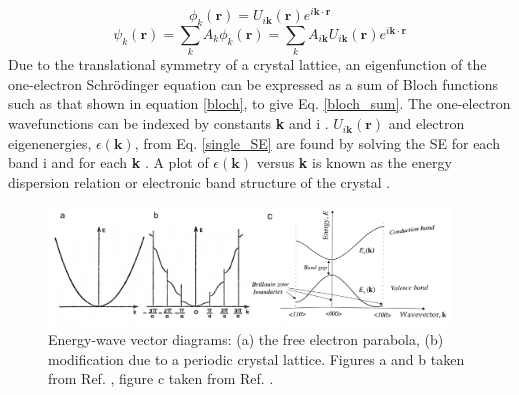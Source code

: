 \documentclass[11pt, twoside]{report}
\begin{document}
\begin{equation} \label{bloch}
\phi_k(\mathbf{r}) = U_{i\mathbf{k}}(\mathbf{r}) e^{i\mathbf{k \cdot r}} 
\end{equation}
\begin{equation} \label{bloch_sum}
\psi_k(\mathbf{r}) = \sum_k A_k \phi_k(\mathbf{r}) = \sum_k A_{i\mathbf{k}}U_{i\mathbf{k}}(\mathbf{r}) e^{i\mathbf{k \cdot r}} 
\end{equation}
Due to the translational symmetry of a crystal lattice, an eigenfunction of the one-electron Schr{\"o}dinger equation can be expressed as a sum of Bloch functions such as that shown in equation \ref{bloch}, to give Eq. \ref{bloch_sum}. The one-electron wavefunctions can be indexed by constants \textbf{k} and i \cite{fund_semi}. 
$U_{i\mathbf{k}}(\mathbf{r})$ and electron eigenenergies, $\epsilon(\mathbf{k})$, from Eq. \ref{single_SE} are found by solving the SE for each band i and for each \textbf{k} \cite{Nelson3}.
A plot of $\epsilon(\textbf{k})$ versus \textbf{k} is known as the energy dispersion relation or electronic band structure of the crystal \cite{fund_semi}.
\begin{figure}[h!]
  \centering
    \includegraphics[width=0.95\textwidth]{figures/bs1_2.png}
    \caption{Energy-wave vector diagrams: (a) the free electron parabola, (b) modification due to a periodic crystal lattice. Figures a and b taken from Ref. , figure c taken from Ref. .}
  \label{bs1}
\end{figure}
\end{document}
